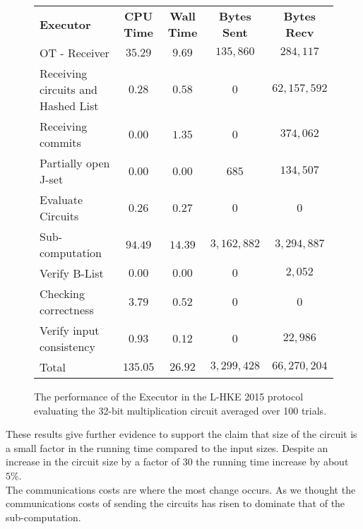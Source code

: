 \documentclass[ %
                    author={Nicholas Tutte},
                supervisor={Prof. Nigel Smart},
                    degree={MEng},
                     title={Secure Two Party Computation},
                  subtitle={A practical comparison of recent protocols},
                      type={Research - GG1K},
                      year={2015} ]{dissertation}
\begin{document}
				\begin{figure}[!ht]
					\begin{tabular}{| p{4.3cm} | c c c c |}
						\hline
						\textbf{Executor} & \textbf{CPU Time} & \textbf{Wall Time} & \textbf{Bytes Sent} & \textbf{Bytes Recv} \\
						\thickhline
						OT - Receiver & $35.29$ & $9.69$ & $135,860$ & $284,117$ \\
						\hline
						Receiving circuits and Hashed List & $0.28$ & $0.58$ & $0$ & $62,157,592$ \\
						\hline
						Receiving commits & $0.00$ & $1.35$ & $0$ & $374,062$ \\
						\hline
						Partially open J-set & $0.00$ & $0.00$ & $685$ & $134,507$ \\
						\hline
						Evaluate Circuits & $0.26$ & $0.27$ & $0$ & $0$ \\
						\hline
						Sub-computation & $94.49$ & $14.39$ & $3,162,882$ & $3,294,887$ \\
						\hline
						Verify B-List & $0.00$ & $0.00$ & $0$ & $2,052$ \\
						\hline
						Checking correctness & $3.79$ & $0.52$ & $0$ & $0$ \\
						\hline
						Verify input consistency & $0.93$ & $0.12$ & $0$ & $22,986$ \\
						\thickhline
						Total & $135.05$ & $26.92$ & $3,299,428$ & $66,270,204$ \\
						\hline
					\end{tabular}
					\caption{The performance of the Executor in the L-HKE 2015 protocol evaluating the 32-bit multiplication circuit averaged over 100 trials. \label{table:L-HKE_2015_Mul_Executor}}
				\end{figure}
				\FloatBarrier

				These results give further evidence to support the claim that size of the circuit is a small factor in the running time compared to the input sizes. Despite an increase in the circuit size by a factor of $30$ the running time increase by about $5\%$.\\

				The communications costs are where the most change occurs. As we thought the communications costs of sending the circuits has risen to dominate that of the sub-computation.\\
\end{document}
